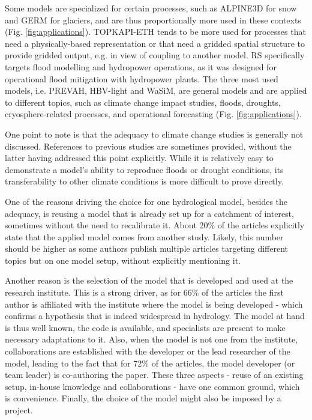 \documentclass[10pt,a4paper]{article}
\begin{document}
Some models are specialized for certain processes, such as ALPINE3D for
snow and GERM for glaciers, and are thus proportionally more used in
these contexts (Fig. \ref{fig:applications}). TOPKAPI-ETH tends
to be more used for processes that need a physically-based
representation or that need a gridded spatial structure to provide
gridded output, e.g. in view of coupling to another model. RS
specifically targets flood modelling and hydropower operations, as it
was designed for operational flood mitigation with hydropower plants.
The three most used models, i.e. PREVAH, HBV-light and WaSiM, are
general models and are applied to different topics, such as climate
change impact studies, floods, droughts, cryosphere-related processes,
and operational forecasting (Fig. \ref{fig:applications}).

One point to note is that the adequacy to climate change studies is
generally not discussed. References to previous studies are sometimes
provided, without the latter having addressed this point explicitly.
While it is relatively easy to demonstrate a model's ability to
reproduce floods or drought conditions, its transferability to other
climate conditions is more difficult to prove directly.

One of the reasons driving the choice for one hydrological model,
besides the adequacy, is reusing a model that is already set up for a
catchment of interest, sometimes without the need to recalibrate it.
About 20\% of the articles explicitly state that the applied model comes
from another study. Likely, this number should be higher as some authors
publish multiple articles targeting different topics but on one model
setup, without explicitly mentioning it.

Another reason is the selection of the model that is developed and used
at the research institute. This is a strong driver, as for 66\% of the
articles the first author is affiliated with the institute where the
model is being developed - which confirms a hypothesis that is indeed
widespread in hydrology. The model at hand is thus well known, the code
is available, and specialists are present to make necessary adaptations
to it. Also, when the model is not one from the institute,
collaborations are established with the developer or the lead researcher
of the model, leading to the fact that for 72\% of the articles, the
model developer (or team leader) is co-authoring the paper. These three
aspects - reuse of an existing setup, in-house knowledge and
collaborations - have one common ground, which is convenience. Finally,
the choice of the model might also be imposed by a project.
\end{document}
